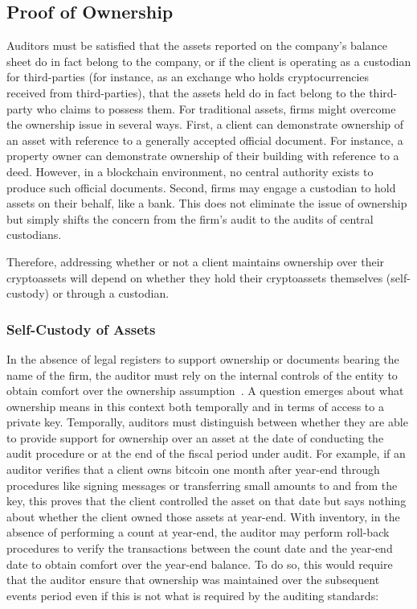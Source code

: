 \subsection{Proof of Ownership}\label{sec:auditing:framework:ownership}

Auditors must be satisfied that the assets reported on the company's balance sheet do in fact belong to the company, or if the client is operating as a custodian for third-parties (for instance, as an exchange who holds cryptocurrencies received from third-parties), that the assets held do in fact belong to the third-party who claims to possess them. For traditional assets, firms might overcome the ownership issue in several ways. First, a client can demonstrate ownership of an asset with reference to a generally accepted official document. For instance, a property owner can demonstrate ownership of their building with reference to a deed. However, in a blockchain environment, no central authority exists to produce such official documents. Second, firms may engage a custodian to hold assets on their behalf, like a bank. This does not eliminate the issue of ownership but simply shifts the concern from the firm's audit to the audits of central custodians.

Therefore, addressing whether or not a client maintains ownership over their cryptoassets will depend on whether they hold their cryptoassets themselves (self-custody) or through a custodian.


\subsubsection{Self-Custody of Assets}
In the absence of legal registers to support ownership or documents bearing the name of the firm, the auditor must rely on the internal controls of the entity to obtain comfort over the ownership assumption~\cite{pimentel2021systemizing}. A question emerges about what ownership means in this context both temporally and in terms of access to a private key. Temporally, auditors must distinguish between whether they are able to provide support for ownership over an asset at the date of conducting the audit procedure or at the end of the fiscal period under audit. For example, if an auditor verifies that a client owns bitcoin one month after year-end through procedures like signing messages or transferring small amounts to and from the key, this proves that the client controlled the asset on that date but says nothing about whether the client owned those assets at year-end. With inventory, in the absence of performing a count at year-end, the auditor may perform roll-back procedures to verify the transactions between the count date and the year-end date to obtain comfort over the year-end balance. To do so, this would require that the auditor ensure that ownership was maintained over the subsequent events period even if this is not what is required by the auditing standards: 

